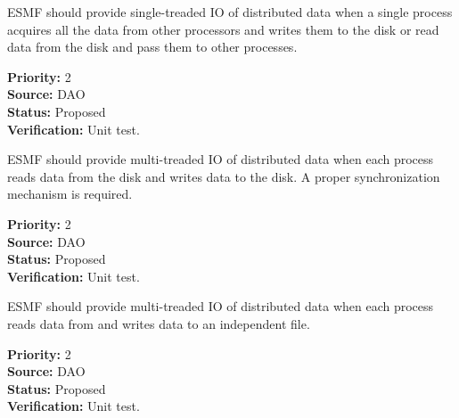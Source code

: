  





ESMF should provide single-treaded IO of distributed data when a
single process acquires all the data from other processors and writes
them to the disk or read data from the disk and pass them to other processes. 


\begin{reqlist}
{\bf Priority:} 2 \\
{\bf Source:} DAO \\
{\bf Status:} Proposed \\
{\bf Verification:} Unit test.
\end{reqlist}



ESMF should provide multi-treaded IO of distributed data when each
process reads data from the disk and writes data to the disk. A proper
synchronization mechanism is required. 

\begin{reqlist}
{\bf Priority:} 2 \\
{\bf Source:} DAO \\
{\bf Status:} Proposed \\
{\bf Verification:} Unit test.
\end{reqlist}




ESMF should provide multi-treaded IO of distributed data when each
process reads data from and writes data to an independent file. 

\begin{reqlist}
{\bf Priority:} 2 \\
{\bf Source:} DAO \\
{\bf Status:} Proposed \\
{\bf Verification:} Unit test.
\end{reqlist}










